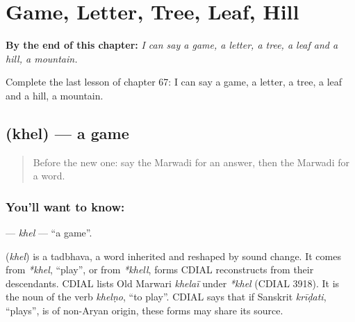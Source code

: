 
\chapter{Game, Letter, Tree, Leaf, Hill}
\label{ch:mw-game-letter-tree-leaf-hill}

\begin{chapteropening}
\textbf{By the end of this chapter:} \emph{I can say a game, a letter, a tree, a leaf and a hill, a mountain.}

Complete the last lesson of chapter 67: I can say a game, a letter, a tree, a leaf and a hill, a mountain.
\end{chapteropening}

\section[\texorpdfstring{\mw{खेल} (khel)}{खेल (khel)}]{ (khel) — a game}

\label{lesson:MW-C67-khel}



\begin{quote}
Before the new one: say the Marwadi for an answer, then the Marwadi for a word.
\end{quote}

\subsection*{You'll want to know: }
\textbf{} — \emph{khel} — \textquotedblleft{}a game\textquotedblright{}.

\begin{cousinweb}
\textbf{} (\emph{khel}) is a tadbhava, a word inherited and reshaped by sound change. It comes from \emph{*khel}, \textquotedblleft{}play\textquotedblright{}, or from \emph{*khell}, forms CDIAL reconstructs from their descendants. CDIAL lists Old Marwari \emph{khelaï} under \emph{*khel} (CDIAL 3918). It is the noun of the verb \emph{khelṇo}, \textquotedblleft{}to play\textquotedblright{}. CDIAL says that if Sanskrit \emph{krīḍati}, \textquotedblleft{}plays\textquotedblright{}, is of non-Aryan origin, these forms may share its source.
\end{cousinweb}

